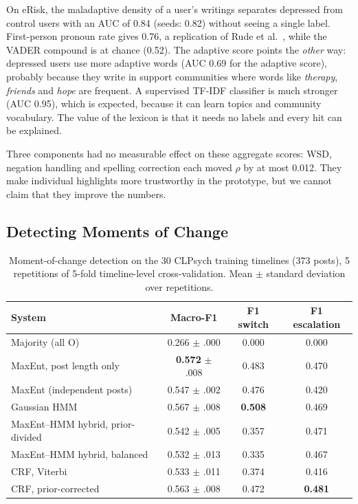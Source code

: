 \documentclass[runningheads]{llncs}
\newcommand{\state}[1]{\textsc{#1}}
\begin{document}
On eRisk, the maladaptive density of a user's writings separates depressed from control users with an AUC of 0.84 (seeds: 0.82) without seeing a single label. First-person pronoun rate gives 0.76, a replication of Rude et al.~\cite{rude2004language}, while the VADER compound is at chance (0.52). The adaptive score points the \emph{other} way: depressed users use more adaptive words (AUC 0.69 for the adaptive score), probably because they write in support communities where words like \emph{therapy}, \emph{friends} and \emph{hope} are frequent. A supervised TF-IDF classifier is much stronger (AUC 0.95), which is expected, because it can learn topics and community vocabulary. The value of the lexicon is that it needs no labels and every hit can be explained.

Three components had no measurable effect on these aggregate scores: WSD, negation handling and spelling correction each moved $\rho$ by at most 0.012. They make individual highlights more trustworthy in the prototype, but we cannot claim that they improve the numbers.

\subsection{Detecting Moments of Change}

\begin{table}[t]
\caption{Moment-of-change detection on the 30 CLPsych training timelines (373 posts), 5 repetitions of 5-fold timeline-level cross-validation. Mean $\pm$ standard deviation over repetitions.}
\label{tab:main}
\centering\small
\begin{tabular}{@{}lccc@{}}
\toprule
System & Macro-F1 & F1 switch & F1 escalation \\
\midrule
Majority (all \state{O})             & 0.266 $\pm$ .000 & 0.000 & 0.000 \\
MaxEnt, post length only             & \textbf{0.572} $\pm$ .008 & 0.483 & 0.470 \\
\midrule
MaxEnt (independent posts)           & 0.547 $\pm$ .002 & 0.476 & 0.420 \\
Gaussian HMM                         & 0.567 $\pm$ .008 & \textbf{0.508} & 0.469 \\
MaxEnt--HMM hybrid, prior-divided    & 0.542 $\pm$ .005 & 0.357 & 0.471 \\
MaxEnt--HMM hybrid, balanced         & 0.532 $\pm$ .013 & 0.335 & 0.467 \\
CRF, Viterbi                         & 0.533 $\pm$ .011 & 0.374 & 0.416 \\
CRF, prior-corrected                 & 0.563 $\pm$ .008 & 0.472 & \textbf{0.481} \\
\bottomrule
\end{tabular}
\end{table}
\end{document}
